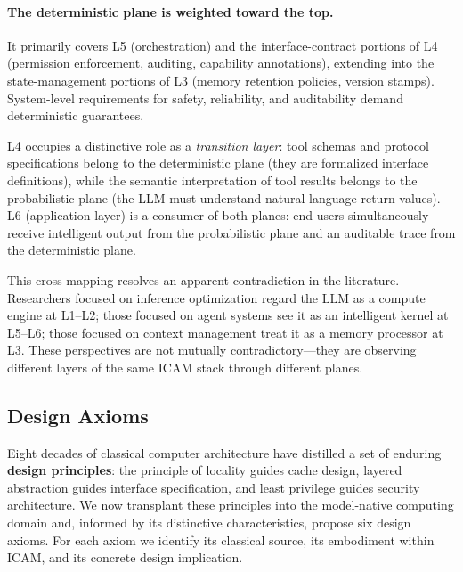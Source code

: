 \documentclass[11pt,a4paper]{article}
\newcounter{axiom}[section]
\begin{document}
\paragraph{The deterministic plane is weighted toward the top.}
It primarily covers L5 (orchestration) and the interface-contract portions of L4 (permission enforcement, auditing, capability annotations), extending into the state-management portions of L3 (memory retention policies, version stamps). System-level requirements for safety, reliability, and auditability demand deterministic guarantees.

L4 occupies a distinctive role as a \textit{transition layer}: tool schemas and protocol specifications belong to the deterministic plane (they are formalized interface definitions), while the semantic interpretation of tool results belongs to the probabilistic plane (the LLM must understand natural-language return values). L6 (application layer) is a consumer of both planes: end users simultaneously receive intelligent output from the probabilistic plane and an auditable trace from the deterministic plane.

This cross-mapping resolves an apparent contradiction in the literature. Researchers focused on inference optimization regard the LLM as a compute engine at L1--L2\cite{kwon2023pagedattention,zhou2024efficientinference}; those focused on agent systems see it as an intelligent kernel at L5--L6\cite{openai_codex_overview_2026,anthropic_claudecode_overview_2026}; those focused on context management treat it as a memory processor at L3\cite{memgpt2023,memoryos2025}. These perspectives are not mutually contradictory---they are observing different layers of the same ICAM stack through different planes.

\subsection{Design Axioms}
\label{sec:icam-axioms}

Eight decades of classical computer architecture have distilled a set of enduring \textbf{design principles}: the principle of locality guides cache design, layered abstraction guides interface specification, and least privilege guides security architecture. We now transplant these principles into the model-native computing domain and, informed by its distinctive characteristics, propose six design axioms. For each axiom we identify its classical source, its embodiment within ICAM, and its concrete design implication.
\end{document}
